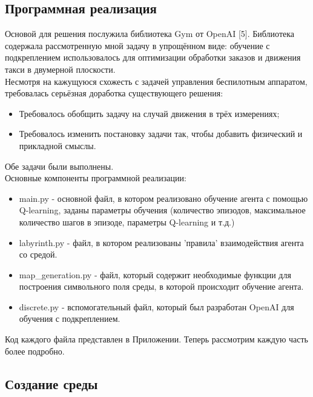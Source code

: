 \documentclass[a4paper]{report}
\theoremstyle{definition}
\theoremstyle{plain}
\theoremstyle{remark}
\theoremstyle{remark}
\theoremstyle{definition}
\begin{document}
\newpage
\begin{center}
\section{Программная реализация}
\end{center}

Основой для решения послужила библиотека Gym от OpenAI [5]. Библиотека содержала рассмотренную мной задачу в упрощённом виде: обучение с подкреплением использовалось для оптимизации обработки заказов и движения такси в двумерной плоскости.\\
Несмотря на кажущуюся схожесть с задачей управления беспилотным аппаратом, требовалась серьёзная доработка существующего решения:
\begin{itemize}
\item Требовалось обобщить задачу на случай движения в трёх измерениях;
\item Требовалось изменить постановку задачи так, чтобы добавить физический и прикладной смыслы.
 \end{itemize}

Обе задачи были выполнены.\\ 

Основные компоненты программной реализации:
\begin{itemize}
\item main.py - основной файл, в котором реализовано обучение агента с помощью Q-learning, заданы параметры обучения (количество эпизодов, максимальное количество шагов в эпизоде, параметры Q-learning и т.д.)
\item labyrinth.py - файл, в котором реализованы 'правила' взаимодействия агента со средой.
\item map\_generation.py - файл, который содержит необходимые функции для построения символьного поля среды, в которой происходит обучение агента.
\item discrete.py - вспомогательный файл, который был разработан OpenAI для обучения с подкреплением.
 \end{itemize}

Код каждого файла представлен в Приложении.
Теперь рассмотрим каждую часть более подробно.
\begin{center}
    \subsection{Создание среды}
\end{center}
\end{document}
